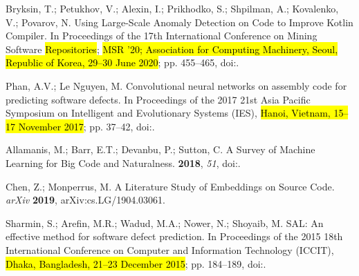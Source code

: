 \documentclass[mathematics,review,accept,moreauthors,pdftex]{Definitions/mdpi}
\begin{document}
\begin{thebibliography}{999}
Bryksin, T.; Petukhov, V.; Alexin, I.; Prikhodko, S.; Shpilman, A.; Kovalenko,
  V.; Povarov, N.
\newblock Using Large-Scale Anomaly Detection on Code to Improve Kotlin
  Compiler.
\newblock  In Proceedings of the 17th International Conference on Mining Software
  \hl{Repositories};  \hl{MSR '20; Association for Computing Machinery, Seoul, Republic of Korea, 29--30 June 2020}; pp. 455–465,
\newblock
  doi:{\href{https://doi.org/10.1145/3379597.3387447}{}}.

{Phan}, A.V.; {Le Nguyen}, M.
\newblock Convolutional neural networks on assembly code for predicting
  software defects.
\newblock  In Proceedings of the 2017 21st Asia Pacific Symposium on Intelligent and Evolutionary
  Systems (IES), \hl{Hanoi, Vietnam, 15--17 November 2017}; pp. 37--42,
\newblock
  doi:{\href{https://doi.org/10.1109/IESYS.2017.8233558}{}}.

Allamanis, M.; Barr, E.T.; Devanbu, P.; Sutton, C.
\newblock A Survey of Machine Learning for Big Code and Naturalness.
 {\bf 2018}, {\em 51},
\newblock
  doi:{\href{https://doi.org/10.1145/3212695}{}}.

Chen, Z.; Monperrus, M.
\newblock A Literature Study of Embeddings on Source Code.  \emph{arXiv} \textbf{2019}, arXiv:cs.LG/1904.03061.

{Sharmin}, S.; {Arefin}, M.R.; {Wadud}, M.A.; {Nower}, N.; {Shoyaib}, M.
\newblock SAL: An effective method for software defect prediction.
\newblock  In Proceedings of the 2015 18th International Conference on Computer and Information
  Technology (ICCIT), \hl{Dhaka, Bangladesh, 21--23 December 2015}; pp. 184--189,
\newblock
  doi:{\href{https://doi.org/10.1109/ICCITechn.2015.7488065}{}}.


\end{thebibliography}
\end{document}
